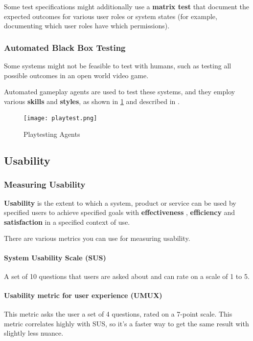Some test specifications might additionally use a \textbf{matrix test} that document the expected outcomes for various user roles or system states (for example, documenting which user roles have which permissions).

\subsubsection{Automated Black Box Testing}
Some systems might not be feasible to test with humans, such as testing all possible outcomes in an open world video game.

Automated gameplay agents are used to test these systems, and they employ various \textbf{skills} and \textbf{styles}, as shown in \cref{fig:playtest} and described in \cite{zhao2020winning}.

\begin{figure}[H]
	\centering
	\texttt{[image: playtest.png]}
	\caption{Playtesting Agents}
	\label{fig:playtest}
\end{figure}


\subsection{Usability}

\subsubsection{Measuring Usability}

\textbf{Usability} is the extent to which a system, product or service can be used by specified users to achieve specified goals with \textbf{effectiveness} , \textbf{efficiency}  and \textbf{satisfaction}  in a specified context of use.

There are various metrics you can use for measuring usability.

\paragraph{System Usability Scale (SUS)} A set of 10 questions that users are asked about and can rate on a scale of 1 to 5.

\paragraph{Usability metric for user experience (UMUX)} This metric asks the user a set of 4 questions, rated on a 7-point scale. This metric correlates highly with SUS, so it's a faster way to get the same result with slightly less nuance.

